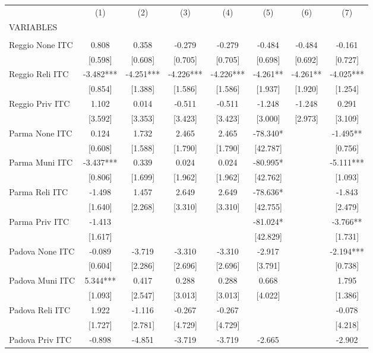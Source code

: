 \begin{tabular}{lccccccc} \hline
 & (1) & (2) & (3) & (4) & (5) & (6) & (7) \\
VARIABLES &  &  &  &  &  &  &  \\ \hline
 &  &  &  &  &  &  &  \\
Reggio None ITC & 0.808 & 0.358 & -0.279 & -0.279 & -0.484 & -0.484 & -0.161 \\
 & [0.598] & [0.608] & [0.705] & [0.705] & [0.698] & [0.692] & [0.727] \\
Reggio Reli ITC & -3.482*** & -4.251*** & -4.226*** & -4.226*** & -4.261** & -4.261** & -4.025*** \\
 & [0.854] & [1.388] & [1.586] & [1.586] & [1.937] & [1.920] & [1.254] \\
Reggio Priv ITC & 1.102 & 0.014 & -0.511 & -0.511 & -1.248 & -1.248 & 0.291 \\
 & [3.592] & [3.353] & [3.423] & [3.423] & [3.000] & [2.973] & [3.109] \\
Parma None ITC & 0.124 & 1.732 & 2.465 & 2.465 & -78.340* &  & -1.495** \\
 & [0.608] & [1.588] & [1.790] & [1.790] & [42.787] &  & [0.756] \\
Parma Muni ITC & -3.437*** & 0.339 & 0.024 & 0.024 & -80.995* &  & -5.111*** \\
 & [0.806] & [1.699] & [1.962] & [1.962] & [42.762] &  & [1.093] \\
Parma Reli ITC & -1.498 & 1.457 & 2.649 & 2.649 & -78.636* &  & -1.843 \\
 & [1.640] & [2.268] & [3.310] & [3.310] & [42.755] &  & [2.479] \\
Parma Priv ITC & -1.413 &  &  &  & -81.024* &  & -3.766** \\
 & [1.617] &  &  &  & [42.829] &  & [1.731] \\
Padova None ITC & -0.089 & -3.719 & -3.310 & -3.310 & -2.917 &  & -2.194*** \\
 & [0.604] & [2.286] & [2.696] & [2.696] & [3.791] &  & [0.738] \\
Padova Muni ITC & 5.344*** & 0.417 & 0.288 & 0.288 & 0.668 &  & 1.795 \\
 & [1.093] & [2.547] & [3.013] & [3.013] & [4.022] &  & [1.386] \\
Padova Reli ITC & 1.922 & -1.116 & -0.267 & -0.267 &  &  & -0.078 \\
 & [1.727] & [2.781] & [4.729] & [4.729] &  &  & [4.218] \\
Padova Priv ITC & -0.898 & -4.851 & -3.719 & -3.719 & -2.665 &  & -2.902 \\

\end{tabular}
